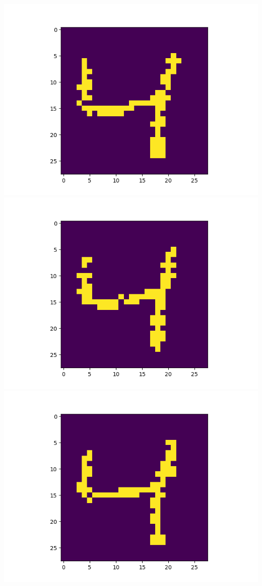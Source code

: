 \includegraphics[scale=0.2]{./bilder/comparison/prob/4}
\includegraphics[scale=0.2]{./bilder/comparison/prob/5}
\includegraphics[scale=0.2]{./bilder/comparison/prob/6}
